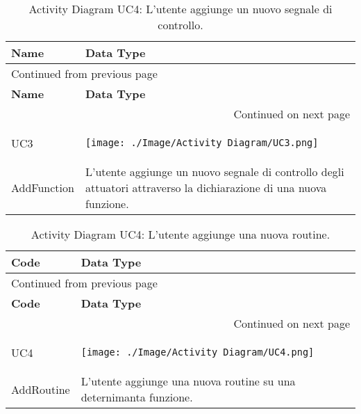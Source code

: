 \documentclass[onecolumn,a4paper]{article}
\begin{document}
\begin{longtable}{|p{2cm}|p{12cm}|}
\caption{Activity Diagram UC4: L’utente aggiunge un nuovo segnale di controllo.}
\\
\cellcolor{grey!15} \textbf{Name} & \cellcolor{grey!15} \textbf{Data Type}\\
\hline
\endfirsthead
\multicolumn{2}{l}{Continued from previous page} \\
\hline

\cellcolor{grey!15} \textbf{Name} & \cellcolor{grey!15} \textbf{Data Type} \\

\hline
\endhead
\hline\multicolumn{2}{r}{Continued on next page} \\
\endfoot
\endlastfoot
\hline
UC3 & \begin{center}
\texttt{[image: ./Image/Activity Diagram/UC3.png]}
\end{center}\\
\hline
AddFunction & L’utente aggiunge un nuovo segnale di controllo degli attuatori attraverso la dichiarazione di una nuova funzione.\\
\hline
\end{longtable}

\begin{longtable}{|p{2cm}|p{12cm}|}
\caption{Activity Diagram UC4:  L’utente aggiunge una nuova routine.}
\\
\cellcolor{grey!15} \textbf{Code} & \cellcolor{grey!15} \textbf{Data Type}\\
\hline
\endfirsthead
\multicolumn{2}{l}{Continued from previous page} \\
\hline

\cellcolor{grey!15} \textbf{Code} & \cellcolor{grey!15} \textbf{Data Type} \\

\hline
\endhead
\hline\multicolumn{2}{r}{Continued on next page} \\
\endfoot
\endlastfoot
\hline
UC4 & \begin{center}
\texttt{[image: ./Image/Activity Diagram/UC4.png]}
\end{center}\\
\hline
AddRoutine & L’utente aggiunge una nuova routine su una deternimanta funzione.\\
\hline
\end{longtable}
\end{document}
